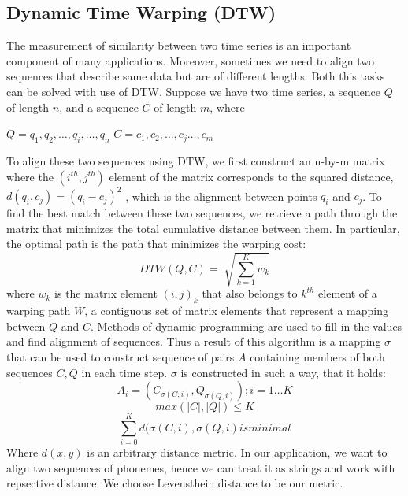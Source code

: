 \subsection*{Dynamic Time Warping (DTW)}\cite{ratanamahatana2004everything}
The measurement of similarity between two time series is an important component of many applications.
Moreover, sometimes we need to align two sequences that describe same data but are of different lengths.
Both this tasks can be solved with use of DTW.
Suppose we have two time series, a sequence $Q$ of length $n$,
and a sequence $C$ of length $m$, where
\begin{center}
$Q = q_1 ,q_2 ,\dots, q_i ,\dots ,q_n$
\linebreak
$C = c_1 ,c_2 ,\dots, c_j \dots, c_m$
\end{center}
To align these two sequences using DTW, we first
construct an n-by-m matrix where the $(i^{th} , j^{th} )$ element of
the matrix corresponds to the squared distance, $d(q_i, c_j) =
(q_i - c_j )^2$ , which is the alignment between points $q_i$ and $c_j$.
To find the best match between these two sequences, we
retrieve a path through the matrix that minimizes the total
cumulative distance between them.
In particular, the optimal path is the path that minimizes the
warping cost:
\begin{equation}
DTW ( Q , C ) = \sqrt[]{\sum_{k=1}^{K}w_k}
\end{equation}
where $w_k$ is the matrix element $(i,j)_k$ that also belongs to $k^{th}$
element of a warping path $W$, a contiguous set of matrix
elements that represent a mapping between $Q$ and $C$.
Methods of dynamic programming are used to fill in the values and find alignment of sequences.
Thus a result of this algorithm is a mapping $\sigma$ that can be used to construct sequence of pairs $A$ containing members of both sequences $C,Q$ in each time step.
$\sigma$ is constructed in such a way, that it holds:
\begin{equation}
A_i = (C_{\sigma (C,i)}, Q_{\sigma (Q, i)}); i = 1 \dots K
\end{equation} 
\begin{equation}
max(|C|,|Q|) \le K
\end{equation}
\begin{equation}
\sum_{i=0}^K d(\sigma (C,i), \sigma(Q,i) is minimal
\end{equation}
Where $d(x,y)$ is an arbitrary distance metric.
In our application, we want to align two sequences of phonemes, hence we can treat it as strings and work with repsective distance.
We choose Levensthein distance to be our metric.
